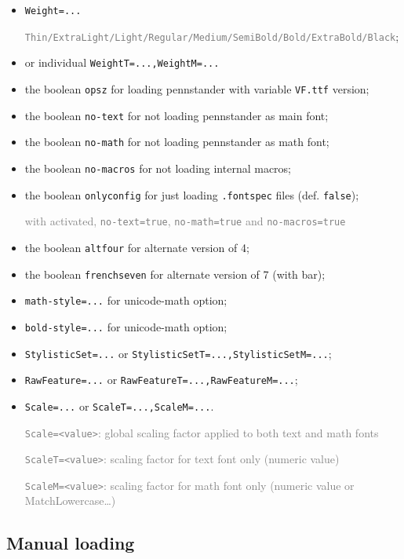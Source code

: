 \documentclass[a4paper]{scrartcl}
\newcommand*{\opt}[1]{\texttt{#1}}
\begin{document}
\begin{itemize}
	\item \opt{Weight=...}

	\textcolor{gray}{\footnotesize \opt{Thin/ExtraLight/Light/Regular/Medium/SemiBold/Bold/ExtraBold/Black}};
	\item or individual \opt{WeightT=...,WeightM=...}
	\item the boolean \opt{opsz} for loading pennstander with variable \texttt{VF.ttf} version;
	\item the boolean \opt{no-text} for not loading pennstander as main font;
	\item the boolean \opt{no-math} for not loading pennstander as math font;
	\item the boolean \opt{no-macros} for not loading internal macros;
	\item the boolean \opt{onlyconfig} for just loading \opt{.fontspec} files (def. \opt{false});

	\textcolor{gray}{\footnotesize with activated, \opt{no-text=true}, \opt{no-math=true} and \opt{no-macros=true}}
	\item the boolean \opt{altfour} for alternate version of 4;
	\item the boolean \opt{frenchseven} for alternate version of 7 (with bar);
	\item \opt{math-style=...} for unicode-math option;
	\item \opt{bold-style=...} for unicode-math option;
	\item \opt{StylisticSet=...} or \opt{StylisticSetT=...,StylisticSetM=...};
	\item \opt{RawFeature=...} or \opt{RawFeatureT=...,RawFeatureM=...};
	\item \opt{Scale=...} or \opt{ScaleT=...,ScaleM=...}.

	\textcolor{gray}{\footnotesize\opt{Scale=<value>}: global scaling factor applied to both text and math fonts}

	\textcolor{gray}{\footnotesize\opt{ScaleT=<value>}: scaling factor for text font only (numeric value)}

	\textcolor{gray}{\footnotesize\opt{ScaleM=<value>}: scaling factor for math font only (numeric value or MatchLowercase\ldots)}
\end{itemize}

\pagebreak

\subsection{Manual loading}
\end{document}
